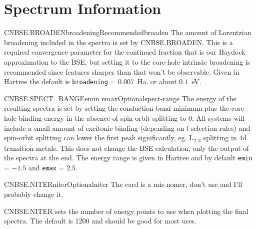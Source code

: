 \documentclass[11pt]{report}
\begin{document}
\section{Spectrum Information}
\label{sec:Spectrum-Information}
\begin{Card}{CNBSE.BROADEN}{broadening}{Recommended}{broaden}
The amount of Lorentzian broadening included in the spectra is set by CNBSE.BROADEN. This is a required convergence parameter for the continued fraction that is our Haydock approximation to the BSE, but setting it to the core-hole intrinsic broadening is recommended since features sharper than that won't be observable. Given in Hartree the default is \texttt{broadening} = $0.007$~Ha. or about $0.1$~eV.
\end{Card}

\begin{Card}{CNBSE.SPECT\_RANGE}{emin emax}{Optional}{spect-range}
The energy of the resulting spectra is set by setting the conduction band minimum plus the core-hole binding energy in the absence of spin-orbit splitting to 0. All systems will include a small amount of excitonic binding (depending on $l$ selection rules) and spin-orbit splitting can lower the first peak significantly, eg. L$_{2,3}$ splitting in 4d transition metals. This does not change the BSE calculation, only the output of the spectra at the end. The energy range is given in Hartree and by default \texttt{emin} = $-1.5$ and \texttt{emax} = $2.5$.
\end{Card}

\begin{Card}{CNBSE.NITER}{niter}{Optional}{niter}
The card is a mis-nomer, don't use and I'll probably change it.

CNBSE.NITER sets the number of energy points to use when plotting the final spectra. The default is 1200 and should be good for most uses.
\end{Card}






%
\end{document}
